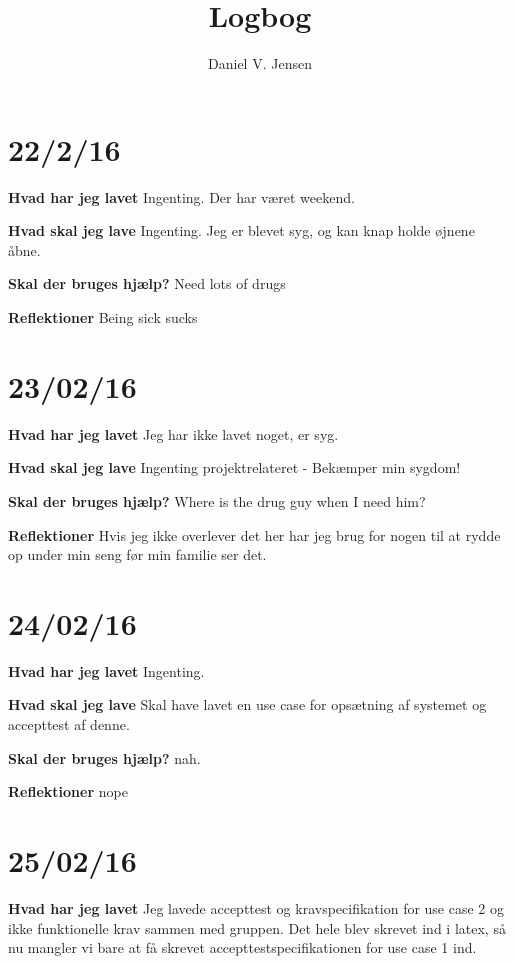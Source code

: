 \documentclass{article}
\title{Logbog}
\author{Daniel V. Jensen}
\date{}
\begin{document}
	\maketitle
	\tableofcontents
	
	\section{22/2/16}
	
	\textbf{Hvad har jeg lavet}
	Ingenting. Der har været weekend.
	
	\textbf{Hvad skal jeg lave}
	Ingenting. Jeg er blevet syg, og kan knap holde øjnene åbne.
	
	
	\textbf{Skal der bruges hjælp?}
	Need lots of drugs
	
	\textbf{Reflektioner}
	Being sick sucks
	
	
	\section{23/02/16}
	
	\textbf{Hvad har jeg lavet}
	Jeg har ikke lavet noget, er syg.
	
	\textbf{Hvad skal jeg lave}
	Ingenting projektrelateret - Bekæmper min sygdom!
	
	\textbf{Skal der bruges hjælp?}
	Where is the drug guy when I need him?
	
	\textbf{Reflektioner}
	Hvis jeg ikke overlever det her har jeg brug for nogen til at rydde op under min seng før min familie ser det.
	
	
	\section{24/02/16}
	
	\textbf{Hvad har jeg lavet}
	Ingenting.
	
	\textbf{Hvad skal jeg lave}
	Skal have lavet en use case for opsætning af systemet og accepttest af denne.
	
	
	\textbf{Skal der bruges hjælp?}
	nah.
	
	\textbf{Reflektioner}
	nope
	
	\section{25/02/16}
	
	\textbf{Hvad har jeg lavet}
	Jeg lavede accepttest og kravspecifikation for use case 2 og ikke funktionelle krav sammen med gruppen. Det hele blev skrevet ind i latex, så nu mangler vi bare at få skrevet accepttestspecifikationen for use case 1 ind.
	
\end{document}
